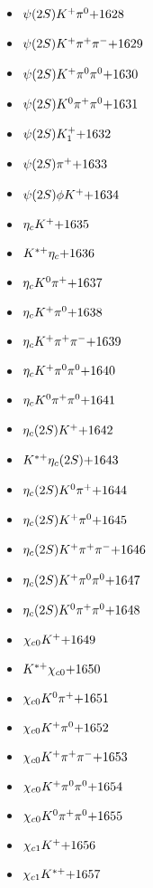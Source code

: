 \begin{multicols}{3}
\begin{itemize}
 \item $ \psi(2S) K^{+} \pi^{0} \hfill{+1628}$
 \item $ \psi(2S) K^{+} \pi^{+} \pi^{-} \hfill{+1629}$
 \item $ \psi(2S) K^{+} \pi^{0} \pi^{0} \hfill{+1630}$
 \item $ \psi(2S) K^{0} \pi^{+} \pi^{0} \hfill{+1631}$
 \item $ \psi(2S) K_{1}^{+} \hfill{+1632}$
 \item $ \psi(2S) \pi^{+} \hfill{+1633}$
 \item $ \psi(2S) \phi K^{+} \hfill{+1634}$
 \item $ \eta_{c} K^{+} \hfill{+1635}$
 \item $ K^{*+} \eta_{c} \hfill{+1636}$
 \item $ \eta_{c} K^{0} \pi^{+} \hfill{+1637}$
 \item $ \eta_{c} K^{+} \pi^{0} \hfill{+1638}$
 \item $ \eta_{c} K^{+} \pi^{+} \pi^{-} \hfill{+1639}$
 \item $ \eta_{c} K^{+} \pi^{0} \pi^{0} \hfill{+1640}$
 \item $ \eta_{c} K^{0} \pi^{+} \pi^{0} \hfill{+1641}$
 \item $ \eta_{c}(2S) K^{+} \hfill{+1642}$
 \item $ K^{*+} \eta_{c}(2S) \hfill{+1643}$
 \item $ \eta_{c}(2S) K^{0} \pi^{+} \hfill{+1644}$
 \item $ \eta_{c}(2S) K^{+} \pi^{0} \hfill{+1645}$
 \item $ \eta_{c}(2S) K^{+} \pi^{+} \pi^{-} \hfill{+1646}$
 \item $ \eta_{c}(2S) K^{+} \pi^{0} \pi^{0} \hfill{+1647}$
 \item $ \eta_{c}(2S) K^{0} \pi^{+} \pi^{0} \hfill{+1648}$
 \item $ \chi_{c0} K^{+} \hfill{+1649}$
 \item $ K^{*+} \chi_{c0} \hfill{+1650}$
 \item $ \chi_{c0} K^{0} \pi^{+} \hfill{+1651}$
 \item $ \chi_{c0} K^{+} \pi^{0} \hfill{+1652}$
 \item $ \chi_{c0} K^{+} \pi^{+} \pi^{-} \hfill{+1653}$
 \item $ \chi_{c0} K^{+} \pi^{0} \pi^{0} \hfill{+1654}$
 \item $ \chi_{c0} K^{0} \pi^{+} \pi^{0} \hfill{+1655}$
 \item $ \chi_{c1} K^{+} \hfill{+1656}$
 \item $ \chi_{c1} K^{*+} \hfill{+1657}$

\end{itemize}
\end{multicols}
